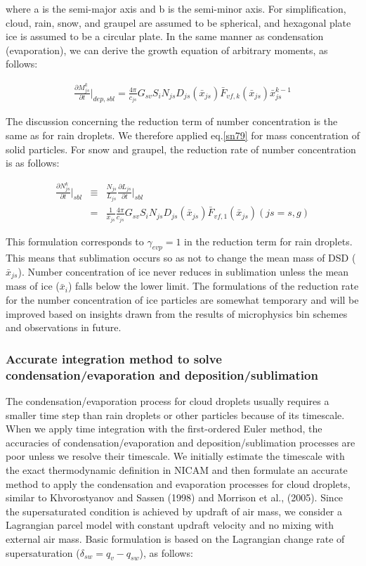 where a is the semi-major axis and b is the semi-minor axis. For simplification, cloud, rain, snow, and graupel are assumed to be spherical, and hexagonal plate ice is assumed to be a circular plate. In the same manner as condensation (evaporation), we can derive the growth equation of arbitrary moments, as follows:

\begin{eqnarray}
\frac{\partial M_{js}^{k}}{\partial t}\Bigr|_{dep,sbl}=\frac{4\pi}{c_{js}}G_{sv}S_{i}N_{js}D_{js}(\bar{x}_{js})\bar{F}_{vf,k}(\bar{x}_{js})\bar{x}_{js}^{k-1}\label{sn79}
\end{eqnarray}

The discussion concerning the reduction term of number concentration is the same as for rain droplets. We therefore applied eq.\ref{sn79} for mass concentration of solid particles. For snow and graupel, the reduction rate of number concentration is as follows:

\begin{eqnarray}
\frac{\partial N_{js}^{k}}{\partial t}\Bigr|_{sbl}&\equiv&\frac{N_{js}}{L_{js}}\frac{\partial L_{js}}{\partial t}\Bigr|_{sbl}\nonumber\\
&=&\frac{1}{\bar{x}_{js}}\frac{4\pi}{c_{js}}G_{sv}S_{i}N_{js}D_{js}(\bar{x}_{js})\bar{F}_{vf,1}(\bar{x}_{js})(js=s,g)\label{sn80}
\end{eqnarray}

This formulation corresponds to $\gamma_{evp} = 1$ in the reduction term for rain droplets. This means that sublimation occurs so as not to change the mean mass of DSD ($\bar{x}_{js}$). Number concentration of ice never reduces in sublimation unless the mean mass of ice ($\bar{x}_{i}$) falls below the lower limit. The formulations of the reduction rate for the number concentration of ice particles are somewhat temporary and will be improved based on insights drawn from the results of microphysics bin schemes and observations in future.

\subsubsection{Accurate integration method to solve condensation/evaporation and deposition/sublimation}
The condensation/evaporation process for cloud droplets usually requires a smaller time step than rain droplets or other particles because of its timescale. When we apply time integration with the first-ordered Euler method, the accuracies of condensation/evaporation and deposition/sublimation processes are poor unless we resolve their timescale. We initially estimate the timescale with the exact thermodynamic definition in NICAM and then formulate an accurate method to apply the condensation and evaporation processes for cloud droplets, similar to Khvorostyanov and Sassen (1998) and Morrison et al., (2005). Since the supersaturated condition is achieved by updraft of air mass, we consider a Lagrangian parcel model with constant updraft velocity and no mixing with external air mass. Basic formulation is based on the Lagrangian change rate of supersaturation ($\delta_{sw} = q_{v} - q_{sw}$), as follows:

